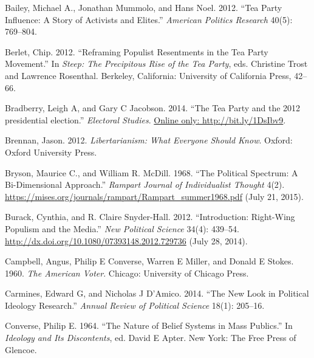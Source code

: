 \documentclass[12pt,]{article}
\begin{document}
Bailey, Michael A., Jonathan Mummolo, and Hans Noel. 2012. ``Tea Party
Influence: A Story of Activists and Elites.'' \emph{American Politics
Research} 40(5): 769--804.

Berlet, Chip. 2012. ``Reframing Populist Resentments in the Tea Party
Movement.'' In \emph{Steep: The Precipitous Rise of the Tea Party}, eds.
Christine Trost and Lawrence Rosenthal. Berkeley, California: University
of California Press, 42--66.

Bradberry, Leigh A, and Gary C Jacobson. 2014. ``The Tea Party and the
2012 presidential election.'' \emph{Electoral Studies}.
\href{Online only: http://bit.ly/1DsIbv9}{Online only: http://bit.ly/1DsIbv9}.

Brennan, Jason. 2012. \emph{Libertarianism: What Everyone Should Know}.
Oxford: Oxford University Press.

Bryson, Maurice C., and William R. McDill. 1968. ``The Political
Spectrum: A Bi-Dimensional Approach.'' \emph{Rampart Journal of
Individualist Thought} 4(2).
\url{https://mises.org/journals/rampart/Rampart_summer1968.pdf} (July
21, 2015).

Burack, Cynthia, and R. Claire Snyder-Hall. 2012. ``Introduction:
Right-Wing Populism and the Media.'' \emph{New Political Science} 34(4):
439--54. \url{http://dx.doi.org/10.1080/07393148.2012.729736} (July 28,
2014).

Campbell, Angus, Philip E Converse, Warren E Miller, and Donald E
Stokes. 1960. \emph{The American Voter}. Chicago: University of Chicago
Press.

Carmines, Edward G, and Nicholas J D'Amico. 2014. ``The New Look in
Political Ideology Research.'' \emph{Annual Review of Political Science}
18(1): 205--16.

Converse, Philip E. 1964. ``The Nature of Belief Systems in Mass
Publics.'' In \emph{Ideology and Its Discontents}, ed. David E Apter.
New York: The Free Press of Glencoe.
\end{document}
